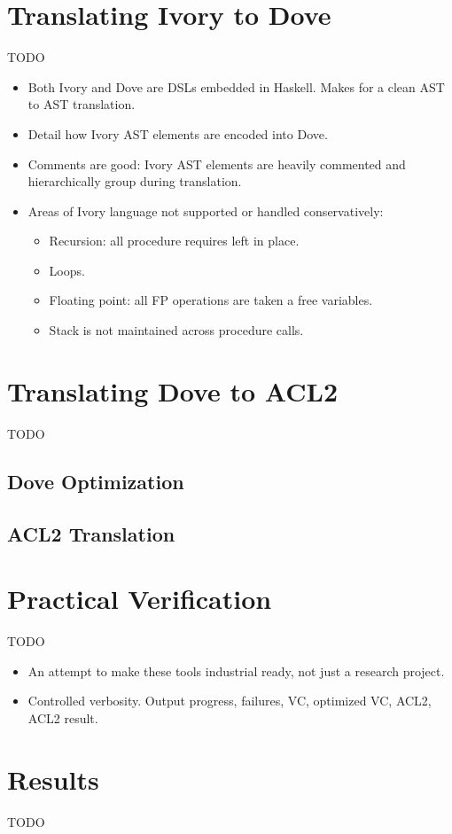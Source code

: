 \documentclass{article}
\begin{document}
\section{Translating Ivory to Dove}
TODO
\begin{itemize}
  \item Both Ivory and Dove are DSLs embedded in Haskell.  Makes for a clean AST to AST translation.
  \item Detail how Ivory AST elements are encoded into Dove.
  \item Comments are good: Ivory AST elements are heavily commented and hierarchically group during translation.
  \item Areas of Ivory language not supported or handled conservatively:
  \begin{itemize}
    \item Recursion: all procedure requires left in place.
    \item Loops.
    \item Floating point: all FP operations are taken a free variables.
    \item Stack is not maintained across procedure calls.
  \end{itemize}
\end{itemize}

\section{Translating Dove to ACL2}
TODO
\subsection{Dove Optimization}
\subsection{ACL2 Translation}

\section{Practical Verification}
TODO
\begin{itemize}
  \item An attempt to make these tools industrial ready, not just a research project.
  \item Controlled verbosity.  Output progress, failures, VC, optimized VC, ACL2, ACL2 result.
\end{itemize}

\section{Results}
TODO
\end{document}
